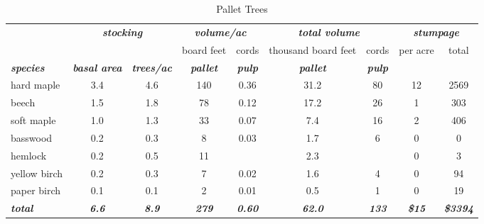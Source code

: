 \documentclass[landscape]{article}
\begin{document}
\begin{table}[H]

\caption{\label{tab:unnamed-chunk-6}Pallet Trees}
\fontsize{10}{12}\selectfont
\begin{tabular}[t]{lcccccccc}
\toprule
\multicolumn{1}{c}{\em{\textbf{ }}} & \multicolumn{2}{c}{\em{\textbf{stocking}}} & \multicolumn{2}{c}{\em{\textbf{volume/ac }}} & \multicolumn{2}{c}{\em{\textbf{total volume}}} & \multicolumn{2}{c}{\em{\textbf{stumpage}}} \\
\cmidrule(l{3pt}r{3pt}){2-3} \cmidrule(l{3pt}r{3pt}){4-5} \cmidrule(l{3pt}r{3pt}){6-7} \cmidrule(l{3pt}r{3pt}){8-9}
\multicolumn{3}{c}{ } & \multicolumn{1}{c}{board feet} & \multicolumn{1}{c}{cords} & \multicolumn{1}{c}{thousand board feet} & \multicolumn{1}{c}{cords} & \multicolumn{1}{c}{per acre} & \multicolumn{1}{c}{total} \\
\cmidrule(l{3pt}r{3pt}){4-4} \cmidrule(l{3pt}r{3pt}){5-5} \cmidrule(l{3pt}r{3pt}){6-6} \cmidrule(l{3pt}r{3pt}){7-7} \cmidrule(l{3pt}r{3pt}){8-8} \cmidrule(l{3pt}r{3pt}){9-9}
\rowcolor[HTML]{DCDCDC}  \em{\textbf{species}} & \em{\textbf{basal area}} & \em{\textbf{trees/ac}} & \em{\textbf{pallet}} & \em{\textbf{pulp}} & \em{\textbf{pallet}} & \em{\textbf{pulp}} & \em{\textbf{ }} & \em{\textbf{ }}\\
\midrule
\rowcolor{gray!6}  hard maple & 3.4 & 4.6 & 140 & 0.36 & 31.2 & 80 & 12 & 2569\\
 
beech & 1.5 & 1.8 & 78 & 0.12 & 17.2 & 26 & 1 & 303\\
 
\rowcolor{gray!6}  soft maple & 1.0 & 1.3 & 33 & 0.07 & 7.4 & 16 & 2 & 406\\
 
basswood & 0.2 & 0.3 & 8 & 0.03 & 1.7 & 6 & 0 & 0\\
 
\rowcolor{gray!6}  hemlock & 0.2 & 0.5 & 11 &  & 2.3 &  & 0 & 3\\
 
yellow birch & 0.2 & 0.3 & 7 & 0.02 & 1.6 & 4 & 0 & 94\\
 
\rowcolor{gray!6}  paper birch & 0.1 & 0.1 & 2 & 0.01 & 0.5 & 1 & 0 & 19\\
 
\rowcolor[HTML]{DCDCDC}  \em{\textbf{total}} & \em{\textbf{6.6}} & \em{\textbf{8.9}} & \em{\textbf{279}} & \em{\textbf{0.60}} & \em{\textbf{62.0}} & \em{\textbf{133}} & \em{\textbf{\$15}} & \em{\textbf{\$3394}}\\
\bottomrule
\end{tabular}
\end{table}
\end{document}
